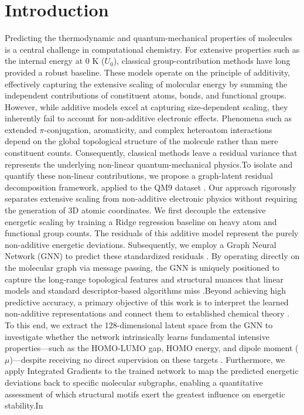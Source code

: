 \documentclass[]{article}
\begin{document}
\section{Introduction}
\label{sec:introduction}
Predicting the thermodynamic and quantum-mechanical properties of molecules is a central challenge in computational chemistry. For extensive properties such as the internal energy at 0 K ($U_0$), classical group-contribution methods have long provided a robust baseline. These models operate on the principle of additivity, effectively capturing the extensive scaling of molecular energy by summing the independent contributions of constituent atoms, bonds, and functional groups. However, while additive models excel at capturing size-dependent scaling, they inherently fail to account for non-additive electronic effects. Phenomena such as extended $\pi$-conjugation, aromaticity, and complex heteroatom interactions depend on the global topological structure of the molecule rather than mere constituent counts. Consequently, classical methods leave a residual variance that represents the underlying non-linear quantum-mechanical physics.To isolate and quantify these non-linear contributions, we propose a graph-latent residual decomposition framework, applied to the QM9 dataset \citep{fu2025benchmarkquantumchemistryrelaxations}. Our approach rigorously separates extensive scaling from non-additive electronic physics without requiring the generation of 3D atomic coordinates. We first decouple the extensive energetic scaling by training a Ridge regression baseline on heavy atom and functional group counts. The residuals of this additive model represent the purely non-additive energetic deviations. Subsequently, we employ a Graph Neural Network (GNN) to predict these standardized residuals \citep{schütt2016quantumchemicalinsightsdeeptensor,xiang2025edbenchlargescaleelectrondensity}. By operating directly on the molecular graph via message passing, the GNN is uniquely positioned to capture the long-range topological features and structural nuances that linear models and standard descriptor-based algorithms miss \citep{schütt2016quantumchemicalinsightsdeeptensor,esders2024analyzingatomicinteractionsmolecules,xiang2025edbenchlargescaleelectrondensity}.Beyond achieving high predictive accuracy, a primary objective of this work is to interpret the learned non-additive representations and connect them to established chemical theory \citep{wang2023graphneuralnetworksmolecules,liu2026latentflowvisualanalyticslatent,han2026multimodalmolecularrepresentationlearning}. To this end, we extract the 128-dimensional latent space from the GNN to investigate whether the network intrinsically learns fundamental intensive properties—such as the HOMO-LUMO gap, HOMO energy, and dipole moment ($\mu$)—despite receiving no direct supervision on these targets \citep{choi2022scalabletraininggraphconvolutional,liu2026enhancingmolecularpropertypredictions,chakraborty2026duallevelatomiccoordinationgeometry}. Furthermore, we apply Integrated Gradients to the trained network to map the predicted energetic deviations back to specific molecular subgraphs, enabling a quantitative assessment of which structural motifs exert the greatest influence on energetic stability.In 
\end{document}
